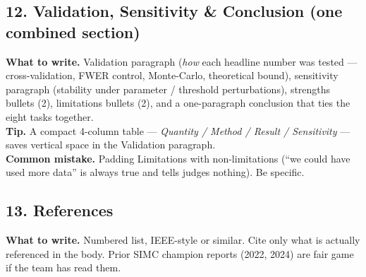 \documentclass[11pt,a4paper]{article}
\begin{document}
\subsection*{12. Validation, Sensitivity \& Conclusion (one combined section)}
\textbf{What to write.} Validation paragraph (\emph{how} each headline number was tested — cross-validation, FWER control, Monte-Carlo, theoretical bound), sensitivity paragraph (stability under parameter / threshold perturbations), strengths bullets (2), limitations bullets (2), and a one-paragraph conclusion that ties the eight tasks together.\\
\textbf{Tip.} A compact 4-column table — \emph{Quantity / Method / Result / Sensitivity} — saves vertical space in the Validation paragraph.\\
\textbf{Common mistake.} Padding Limitations with non-limitations (``we could have used more data'' is always true and tells judges nothing). Be specific.

\subsection*{13. References}
\textbf{What to write.} Numbered list, IEEE-style or similar. Cite only what is actually referenced in the body. Prior SIMC champion reports (2022, 2024) are fair game if the team has read them.
\end{document}
